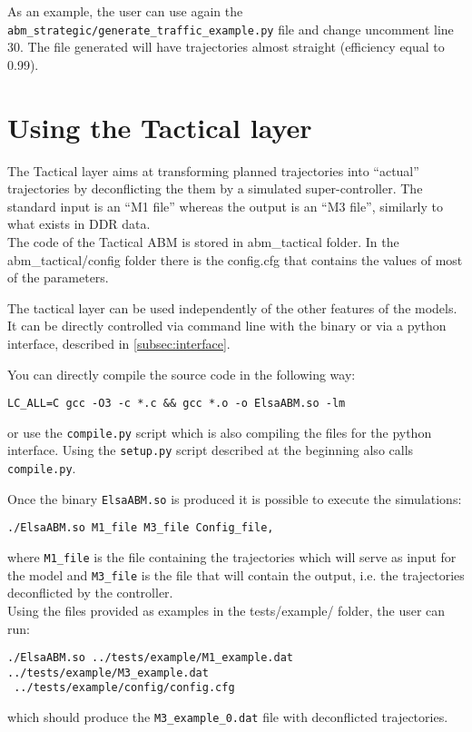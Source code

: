 \documentclass[12pt]{article}
\begin{document}
As an example, the user can use again the \verb|abm_strategic/generate_traffic_example.py| file and change uncomment line 30. The file generated will have trajectories almost straight (efficiency equal to 0.99).

\section{Using the Tactical layer}
The Tactical layer aims at transforming planned trajectories into ``actual'' trajectories by deconflicting the them by a simulated super-controller. The standard input is an ``M1 file'' whereas the output is an ``M3 file'', similarly to what exists in DDR data.
\\

The code of the Tactical ABM is stored in abm\_tactical folder. In the abm\_tactical/config folder there is the config.cfg that contains the values of most of the parameters.

The tactical layer can be used independently of the other features of the models. It can be directly controlled via command line with the binary or via a python interface, described in \ref{subsec:interface}.

You can directly compile the source code in the following way:

\begin{verbatim}
LC_ALL=C gcc -O3 -c *.c && gcc *.o -o ElsaABM.so -lm
\end{verbatim}
or use the \verb|compile.py| script which is also compiling the files for the python interface. Using the \verb|setup.py| script described at the beginning also calls \verb|compile.py|.

Once the binary \verb|ElsaABM.so| is produced it is possible to execute the simulations:

\begin{verbatim}
./ElsaABM.so M1_file M3_file Config_file,
\end{verbatim}
where \verb|M1_file| is the file containing the trajectories which will serve as input for the model and \verb|M3_file| is the file that will contain the output, i.e. the trajectories deconflicted by the controller.
\\

Using the files provided as examples in the tests/example/ folder, the user can run:
\begin{verbatim}
./ElsaABM.so ../tests/example/M1_example.dat ../tests/example/M3_example.dat
 ../tests/example/config/config.cfg
\end{verbatim}
which should produce the \verb|M3_example_0.dat| file with deconflicted trajectories. 
\end{document}
